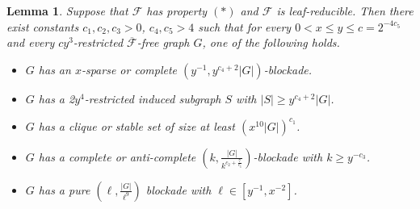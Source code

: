 \documentclass[a4paper,11pt]{article}
\newtheorem{lemma}[theorem]{Lemma}
\begin{document}
    \begin{lemma}\label{lem:main-once-a-block-turn1}
        Suppose that $\mathcal{F}$ has property $(*)$ and $\mathcal{F}$ is leaf-reducible. 
        Then there exist constants $c_1,c_2,c_3>0$, $c_4,c_5>4$ such that for every $0<x\leq y\leq c=2^{-4c_5}$ and every $cy^3$-restricted $\overline{\mathcal{F}}$-free graph $G$, one of the following holds.
        \begin{itemize}
            \item[$(1)$] $G$ has an $x$-sparse or complete $(y^{-1},y^{c_4+2}|G|)$-blockade.
            
            \item[$(2)$] $G$ has a 2$y^{4}$-restricted induced subgraph $S$ with $|S|\geq y^{c_4+2}|G|$.
            
            \item[$(3)$] $G$ has a clique or stable set of size at least $(x^{10}|G|)^{c_1}$.
            
            \item[$(4)$] $G$ has a complete or anti-complete $(k,\frac{|G|}{k^{c_2+\frac{7}{c_3}}})$-blockade with $k\geq y^{-c_3}$. 
            
            \item[$(5)$] $G$ has a pure $(\ell,\frac{|G|}{\ell^{9}})$ blockade with $\ell\in[y^{-1}, x^{-2}]$. 
        \end{itemize}
    \end{lemma}
\end{document}
